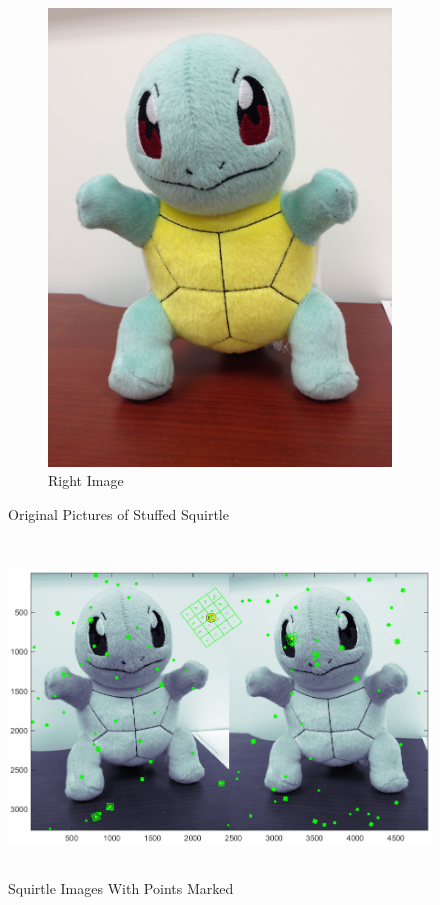 \documentclass[11pt,psfig]{article}
\begin{document}
\begin{figure}
\begin{subfigure}[b]{0.4\textwidth}
                \includegraphics[width=\textwidth]{squirtle2.jpg}
                \caption{Right Image}
        \end{subfigure}
        \caption{Original Pictures of Stuffed Squirtle}
        \label{sq1}
\end{figure}

\begin{figure}[H]
\centering
\includegraphics[height=3.5in]{squirtle_pointsWoMatching.png}
\caption{Squirtle Images With Points Marked}
\label{sq2}
\end{figure}
\end{document}
